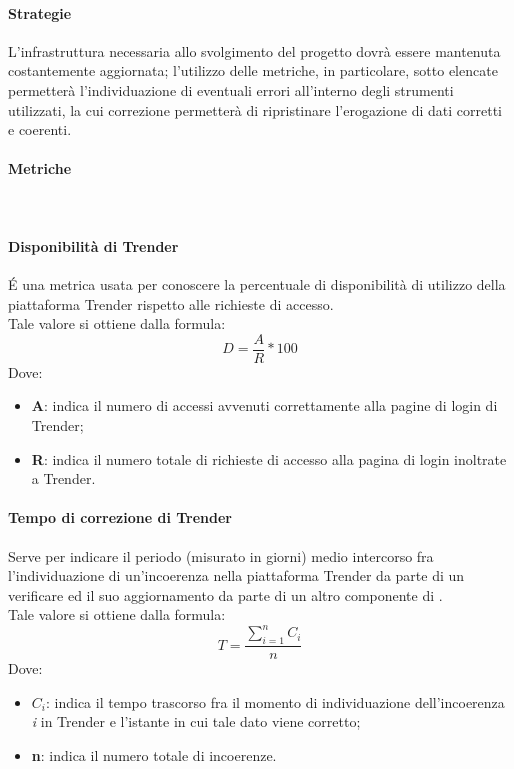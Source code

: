 \documentclass[../NormeDiProgetto.tex]{subfiles}
\begin{document}
			\paragraph{Strategie}
			L'infrastruttura necessaria allo svolgimento del progetto dovrà essere mantenuta costantemente aggiornata; l'utilizzo delle metriche, in particolare, sotto elencate permetterà l'individuazione di eventuali errori all'interno degli strumenti utilizzati, la cui correzione permetterà di ripristinare l'erogazione di dati corretti e coerenti.
			
			\paragraph{Metriche}\mbox{}\\
			\paragraph{Disponibilità di Trender}
			É una metrica usata per conoscere la percentuale di disponibilità di utilizzo della piattaforma Trender rispetto alle richieste di accesso.\\Tale valore si ottiene dalla formula:
				\begin{equation*}
					D = \frac{A}{R} * 100
				\end{equation*}
				Dove:
				\begin{itemize}
					\item \textbf{A}: indica il numero di accessi avvenuti correttamente alla pagine di login di Trender;
					\item \textbf{R}: indica il numero totale di richieste di accesso alla pagina di login inoltrate a Trender.
				\end{itemize}
			
			\paragraph{Tempo di correzione di Trender}
			Serve per indicare il periodo (misurato in giorni) medio intercorso fra l'individuazione di un'incoerenza nella piattaforma Trender da parte di un verificare ed il suo aggiornamento da parte di un altro componente di \kpanic.\\Tale valore si ottiene dalla formula:
				\begin{equation*}
					T =\frac{\sum_{i=1}^n C_{i}}{n}
				\end{equation*}
				Dove:
				\begin{itemize}
					\item \textbf{$C_{i}$}: indica il tempo trascorso fra il momento di individuazione dell'incoerenza \textit{i} in Trender e l'istante in cui tale dato viene corretto;
					\item \textbf{n}: indica il numero totale di incoerenze.
				\end{itemize}
\end{document}
